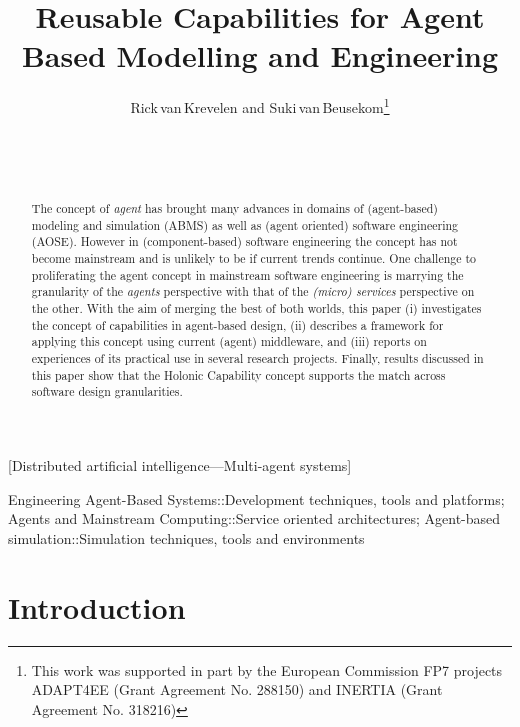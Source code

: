 \documentclass{aamas2015}
\author{Rick\,van\,Krevelen and Suki\,van\,Beusekom\thanks{This work was
supported in part by the European Commission FP7 projects ADAPT4EE (Grant
Agreement No. 288150) and INERTIA (Grant
Agreement No. 318216)} \\
\\
\affaddr{Almende BV} \\
\affaddr{Rotterdam, The Netherlands} \\
\email{\href{mailto:rick@almende.org}{\nolinkurl{rick@almende.org}},
\href{mailto:suki@almende.org}{\nolinkurl{suki@almende.org}}}}
\title{Reusable Capabilities for Agent Based Modelling and Engineering}
\begin{document}
\maketitle

\begin{abstract}
The concept of \emph{agent} has brought many advances in domains of
(agent-based) modeling and simulation (ABMS) as well as (agent oriented) 
software engineering (AOSE). However in (component-based) software engineering 
the concept has not become mainstream and is unlikely to be if current trends continue.
One challenge to proliferating the agent concept in mainstream software
engineering is marrying the granularity of the \emph{agents} perspective with
that of the \emph{(micro) services} perspective on the other.
With the aim of merging the best of both worlds, this paper (i) investigates 
the concept of capabilities in agent-based design, (ii) describes a 
framework for applying this concept using current (agent) middleware, and (iii) 
reports on experiences of its practical use in several research projects. 
Finally, results discussed in this paper show that the Holonic Capability 
concept supports the match across software design granularities.
\end{abstract}

[Distributed
artificial intelligence---Multi-agent systems]


\begin{keywords}
Engineering Agent-Based Systems::Development techniques, tools and platforms;
Agents and Mainstream Computing::Service oriented architectures; 
Agent-based simulation::Simulation techniques, tools and environments
\end{keywords}


\section{Introduction}
\label{sec:intro}
\end{document}
